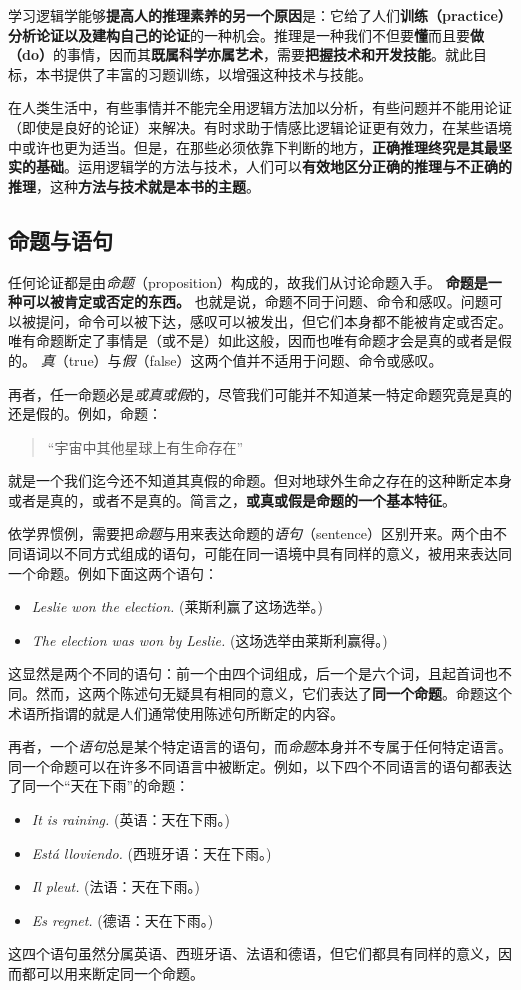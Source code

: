 学习逻辑学能够\textbf{提高人的推理素养的另一个原因}是：它给了人们\textbf{训练（practice）分析论证以及建构自己的论证}的一种机会。推理是一种我们不但要\textbf{懂}而且要\textbf{做（do）}的事情，因而其\textbf{既属科学亦属艺术}，需要\textbf{把握技术和开发技能}。就此目标，本书提供了丰富的习题训练，以增强这种技术与技能。

在人类生活中，有些事情并不能完全用逻辑方法加以分析，有些问题并不能用论证（即使是良好的论证）来解决。有时求助于情感比逻辑论证更有效力，在某些语境中或许也更为适当。但是，在那些必须依靠下判断的地方，\textbf{正确推理终究是其最坚实的基础}。运用逻辑学的方法与技术，人们可以\textbf{有效地区分正确的推理与不正确的推理}，这种\textbf{方法与技术就是本书的主题}。


\subsection{命题与语句}
任何论证都是由\emph{命题}（proposition）构成的，故我们从讨论命题入手。
\textbf{命题是一种可以被肯定或否定的东西。}
也就是说，命题不同于问题、命令和感叹。问题可以被提问，命令可以被下达，感叹可以被发出，但它们本身都不能被肯定或否定。唯有命题断定了事情是（或不是）如此这般，因而也唯有命题才会是真的或者是假的。
\emph{真}（true）与\emph{假}（false）这两个值并不适用于问题、命令或感叹。

再者，任一命题必是\emph{或真或假}的，尽管我们可能并不知道某一特定命题究竟是真的还是假的。例如，命题：
\begin{quote}
    “宇宙中其他星球上有生命存在”
\end{quote}
就是一个我们迄今还不知道其真假的命题。但对地球外生命之存在的这种断定本身或者是真的，或者不是真的。简言之，\textbf{或真或假是命题的一个基本特征}。

依学界惯例，需要把\emph{命题}与用来表达命题的\emph{语句}（sentence）区别开来。两个由不同语词以不同方式组成的语句，可能在同一语境中具有同样的意义，被用来表达同一个命题。例如下面这两个语句：
\begin{itemize}
    \item \textit{Leslie won the election.} (莱斯利赢了这场选举。)
    \item \textit{The election was won by Leslie.} (这场选举由莱斯利赢得。)
\end{itemize}
这显然是两个不同的语句：前一个由四个词组成，后一个是六个词，且起首词也不同。然而，这两个陈述句无疑具有相同的意义，它们表达了\textbf{同一个命题}。命题这个术语所指谓的就是人们通常使用陈述句所断定的内容。

再者，一个\emph{语句}总是某个特定语言的语句，而\emph{命题}本身并不专属于任何特定语言。同一个命题可以在许多不同语言中被断定。例如，以下四个不同语言的语句都表达了同一个“天在下雨”的命题：
\begin{itemize}
    \item \textit{It is raining.} (英语：天在下雨。)
    \item \textit{Está lloviendo.} (西班牙语：天在下雨。)
    \item \textit{Il pleut.} (法语：天在下雨。)
    \item \textit{Es regnet.} (德语：天在下雨。)
\end{itemize}
这四个语句虽然分属英语、西班牙语、法语和德语，但它们都具有同样的意义，因而都可以用来断定同一个命题。

